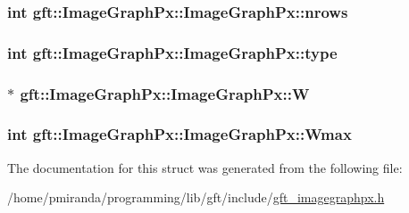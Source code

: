 \subsubsection[{\texorpdfstring{nrows}{nrows}}]{\setlength{\rightskip}{0pt plus 5cm}int gft\+::\+Image\+Graph\+Px\+::\+Image\+Graph\+Px\+::nrows}\hypertarget{structgft_1_1ImageGraphPx_1_1ImageGraphPx_af32dec714c37e33f670780b0cabae2e1}{}\label{structgft_1_1ImageGraphPx_1_1ImageGraphPx_af32dec714c37e33f670780b0cabae2e1}
\subsubsection[{\texorpdfstring{type}{type}}]{\setlength{\rightskip}{0pt plus 5cm}int gft\+::\+Image\+Graph\+Px\+::\+Image\+Graph\+Px\+::type}\hypertarget{structgft_1_1ImageGraphPx_1_1ImageGraphPx_ad6a1921efaf31f98fc16b12e622459a3}{}\label{structgft_1_1ImageGraphPx_1_1ImageGraphPx_ad6a1921efaf31f98fc16b12e622459a3}
\subsubsection[{\texorpdfstring{W}{W}}]{$\ast$ gft\+::\+Image\+Graph\+Px\+::\+Image\+Graph\+Px\+::W}\hypertarget{structgft_1_1ImageGraphPx_1_1ImageGraphPx_a8c4d8b7a8d10d627e0de1dde2bca80f5}{}\label{structgft_1_1ImageGraphPx_1_1ImageGraphPx_a8c4d8b7a8d10d627e0de1dde2bca80f5}
\subsubsection[{\texorpdfstring{Wmax}{Wmax}}]{\setlength{\rightskip}{0pt plus 5cm}int gft\+::\+Image\+Graph\+Px\+::\+Image\+Graph\+Px\+::\+Wmax}\hypertarget{structgft_1_1ImageGraphPx_1_1ImageGraphPx_ae0daf2408cba9edfea66b134dffc1ee2}{}\label{structgft_1_1ImageGraphPx_1_1ImageGraphPx_ae0daf2408cba9edfea66b134dffc1ee2}


The documentation for this struct was generated from the following file\+:\begin{DoxyCompactItemize}
\item 
/home/pmiranda/programming/lib/gft/include/\hyperlink{gft__imagegraphpx_8h}{gft\+\_\+imagegraphpx.\+h}\end{DoxyCompactItemize}
